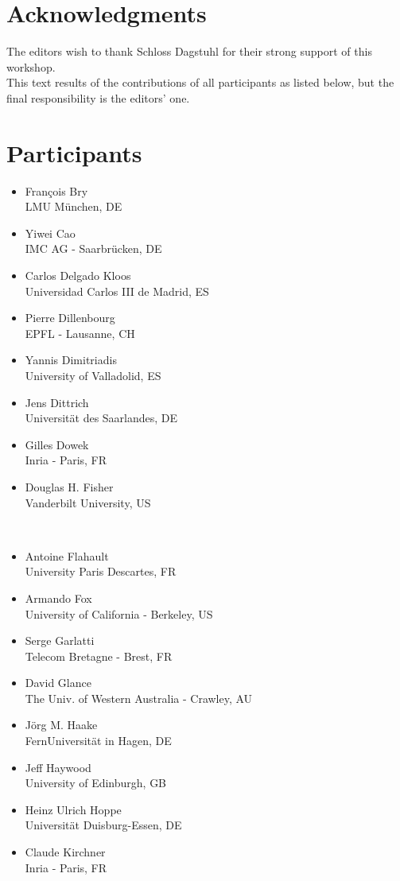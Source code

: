\section{Acknowledgments}

The editors wish to thank Schloss Dagstuhl for their strong support of this workshop.\\
This text results of the contributions of all participants as listed below, but the final responsibility is the editors' one.

\section{Participants}

\begin{minipage}[t]{0.32\linewidth} \footnotesize
  \begin{itemize} 
  \item François Bry\\ LMU München, DE
\item Yiwei Cao\\ IMC AG - Saarbrücken, DE
\item Carlos Delgado Kloos \\ Universidad Carlos III de Madrid, ES
\item Pierre Dillenbourg  \\ EPFL - Lausanne, CH
\item Yannis Dimitriadis \\ University of Valladolid, ES
\item Jens Dittrich \\ Universität des Saarlandes, DE
\item Gilles Dowek \\ Inria - Paris, FR
\item Douglas H. Fisher \\ Vanderbilt University, US
\end{itemize}
\end{minipage}~
\begin{minipage}[t]{0.32\linewidth} \footnotesize
\begin{itemize}
\item Antoine Flahault \\ University Paris Descartes, FR
\item Armando Fox \\ University of California - Berkeley, US
\item Serge Garlatti \\ Telecom Bretagne - Brest, FR
\item David Glance  \\The Univ. of Western Australia - Crawley, AU
\item Jörg M. Haake \\ FernUniversität in Hagen, DE
\item Jeff Haywood \\ University of Edinburgh, GB
\item Heinz Ulrich Hoppe \\ Universität Duisburg-Essen, DE
\item Claude Kirchner \\ Inria - Paris, FR
\end{itemize}
\end{minipage}~
